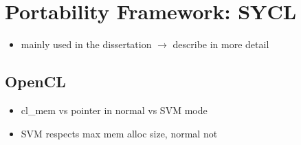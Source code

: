 \section{Portability Framework: SYCL}

\begin{itemize}
    \item mainly used in the dissertation $\rightarrow$ describe in more detail
\end{itemize}

\subsection{OpenCL}

\begin{itemize}
    \item cl\_mem vs pointer in normal vs SVM mode
    \item SVM respects max mem alloc size, normal not
\end{itemize}